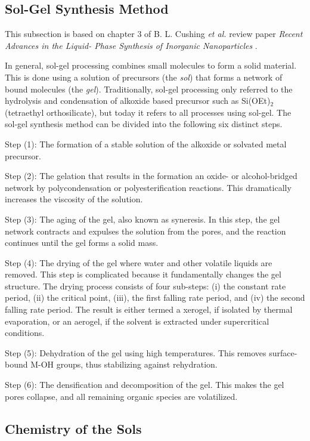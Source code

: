 \subsection{Sol-Gel Synthesis Method}
\noindent This subsection is based on chapter 3 of B. L. Cushing \textit{et al.} review paper \textit{Recent Advances in the Liquid- Phase Synthesis of Inorganic Nanoparticles} \cite{solgel_review}.

In general, sol-gel processing combines small molecules to form a solid material.
This is done using a solution of precursors (the \textit{sol}) that forms a network of bound molecules (the \textit{gel}).
Traditionally, sol-gel processing only referred to the hydrolysis and condensation of alkoxide based precursor such as Si(OEt)$_2$ (tetraethyl orthosilicate), but today it refers to all processes using sol-gel.
The sol-gel synthesis method can be divided into the following six distinct steps.

Step (1): The formation of a stable solution of the alkoxide or solvated metal precursor.

Step (2): The gelation that results in the formation  an oxide- or alcohol-bridged network by polycondensation or polyesterification reactions.
This dramatically increases the viscosity of the solution.

Step (3):  The aging of the gel, also known as syneresis.
In this step, the gel network contracts and expulses the solution from the pores, and the reaction continues until the gel forms a solid mass.

Step (4): The drying of the gel where water and other volatile liquids are removed.
This step is complicated because it fundamentally changes the gel structure.
The drying process consists of four sub-steps: (i) the constant rate period, (ii) the critical point, (iii), the first falling rate period, and (iv) the second falling rate period.
The result is either termed a xerogel, if isolated by thermal evaporation, or an aerogel, if the solvent is extracted under supercritical conditions.

Step (5): Dehydration of the gel using high temperatures.
This removes surface-bound M-OH groups, thus stabilizing against rehydration.

Step (6): The densification and decomposition of the gel.
This makes the gel pores collapse, and all remaining organic species are volatilized.

\subsection{Chemistry of the Sols}

